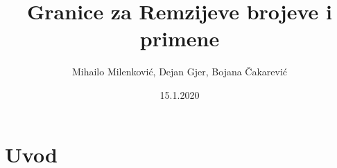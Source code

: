 \documentclass{article}
\title{Granice za Remzijeve brojeve i primene}
\date{15.1.2020}
\author{Mihailo Milenković, Dejan Gjer, Bojana Čakarević}
\begin{document}
	\maketitle
	\newpage
	\tableofcontents
	\newpage
	\section{Uvod}
	\lipsum[1]
\end{document}
